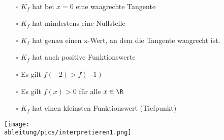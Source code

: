 \begin{Exercise}[title={\raggedright Zu sehen ist das Schaubild der Ableitung \(f'(x)\) einer Funktion \(f(x)\) mit dem Schaubild \(K_f\). Die Ableitungsfunktion hat den Grad 3. Kreuze die Aussagen an, die wahr sein müssen.}, label=ableitungInterpretationA1]\\
	\begin{minipage}{\textwidth}
		\begin{minipage}[][][c]{0.55\textwidth}
			\begin{itemize}
				\item[$\square$] \(K_f\) hat bei \(x=0\) eine waagrechte Tangente
				\item[$\square$] \(K_f\) hat mindestens eine Nullstelle
				\item[$\square$] \(K_f\) hat genau einen x-Wert, an dem die Tangente waagrecht ist.
				\item[$\square$] \(K_f\) hat auch positive Funktionswerte
				\item[$\square$] Es gilt \(f(-2)>f(-1)\)
				\item[$\square$] Es gilt \(f(x)>0\) für alle \(x\in\R\)
				\item[$\square$] \(K_f\) hat einen kleinsten Funktionswert (Tiefpunkt)

			\end{itemize}
		\end{minipage}
		\begin{minipage}[][][c]{0.44\textwidth}
			\centering\texttt{[image: \\ableitung/pics/interpretieren1.png]}
		\end{minipage}
	\end{minipage}
\end{Exercise}

